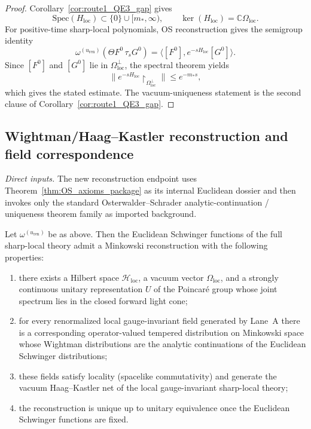 \begin{proof}
Corollary~\ref{cor:route1_QE3_gap} gives
\[
\mathrm{Spec}(H_{\mathrm{loc}})\subset \{0\}\cup[m_*,\infty),
\qquad
\ker(H_{\mathrm{loc}})=\mathbb C\Omega_{\mathrm{loc}}.
\]
For positive-time sharp-local polynomials, OS reconstruction gives the semigroup identity
\[
\omega^{(u_{\mathrm{ren}})}(\Theta F^0\,\tau_s G^0)
=\langle [F^0],e^{-sH_{\mathrm{loc}}}[G^0]\rangle.
\]
Since $[F^0]$ and $[G^0]$ lie in $\Omega_{\mathrm{loc}}^\perp$, the spectral theorem yields
\[
\|e^{-sH_{\mathrm{loc}}}\!\restriction_{\Omega_{\mathrm{loc}}^\perp}\|\le e^{-m_* s},
\]
which gives the stated estimate.
The vacuum-uniqueness statement is the second clause of Corollary~\ref{cor:route1_QE3_gap}.
\end{proof}

\subsection{Wightman/Haag--Kastler reconstruction and field correspondence}

\noindent\emph{Direct inputs.} The new reconstruction endpoint uses Theorem~\ref{thm:OS_axioms_package} as its internal Euclidean dossier and then invokes only the standard Osterwalder--Schrader analytic-continuation / uniqueness theorem family as imported background.\par

\begin{theorem}\label{thm:OS_to_Wightman}
Let $\omega^{(u_{\mathrm{ren}})}$ be as above.
Then the Euclidean Schwinger functions of the full sharp-local theory admit a Minkowski reconstruction with the following properties:
\begin{enumerate}[label=(\roman*),leftmargin=2.3em]
\item there exists a Hilbert space $\mathcal H_{\mathrm{loc}}$, a vacuum vector $\Omega_{\mathrm{loc}}$, and a strongly continuous unitary representation $U$ of the Poincar\'e group whose joint spectrum lies in the closed forward light cone;
\item for every renormalized local gauge-invariant field generated by Lane~A there is a corresponding operator-valued tempered distribution on Minkowski space whose Wightman distributions are the analytic continuations of the Euclidean Schwinger distributions;
\item these fields satisfy locality (spacelike commutativity) and generate the vacuum Haag--Kastler net of the local gauge-invariant sharp-local theory;
\item the reconstruction is unique up to unitary equivalence once the Euclidean Schwinger functions are fixed.
\end{enumerate}
\end{theorem}

